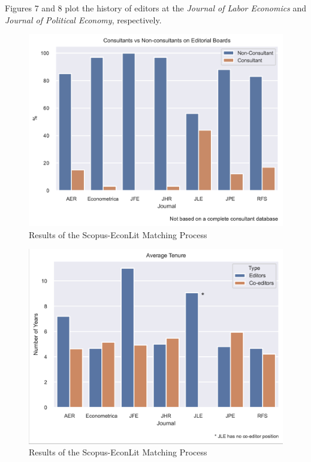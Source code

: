 \documentclass[11pt, letterpaper, twoside]{article}
\begin{document}
Figures 7 and 8 plot the history of editors at the \textit{Journal of Labor Economics} and \textit{Journal of Political Economy}, respectively.

\begin{figure}[h]
    \centering    
    \includegraphics[width=\textwidth]{figures/total_editors.png}
    \caption{Results of the Scopus-EconLit Matching Process}
\end{figure}
\begin{figure}[h]
    \centering    
    \includegraphics[width=\textwidth]{figures/editors_avg_tenure.png}
    \caption{Results of the Scopus-EconLit Matching Process}
\end{figure}
\end{document}

